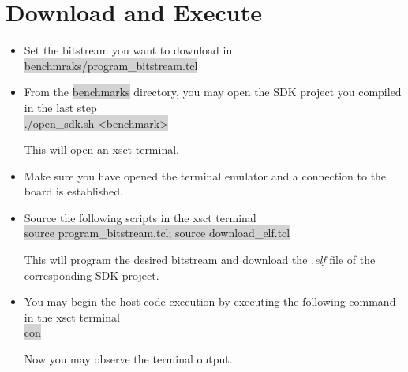 \documentclass[11pt]{article}
\begin{document}
\section{Download and Execute}
\begin{itemize}
  \item Set the bitstream you want to download in \colorbox{lightGray}{benchmraks/program\_bitstream.tcl}
  \item From the \colorbox{lightGray}{benchmarks} directory, you may open the SDK project you compiled in the last step \\
      \centering \colorbox{lightGray}{./open\_sdk.sh <benchmark>} \\
  \raggedright 
  This will open an xsct terminal.
  \item Make sure you have opened the terminal emulator and a connection to the board is established.
  \item Source the following scripts in the xsct terminal \\
      \centering \colorbox{lightGray}{source program\_bitstream.tcl; source download\_elf.tcl} \\
    \raggedright 
    This will program the desired bitstream and download the \emph{.elf} file of the corresponding SDK project.
  \item You may begin the host code execution by executing the following command in the xsct terminal\\
    \centering \colorbox{lightGray}{con} \\
    \raggedright 
      Now you may observe the terminal output.
\end{itemize}
\end{document}
